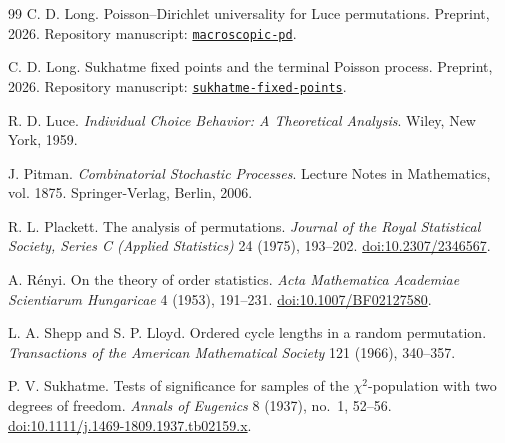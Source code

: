 \documentclass[11pt]{article}
\theoremstyle{definition}
\theoremstyle{remark}
\begin{document}
\begin{thebibliography}{99}
C. D. Long.
\newblock Poisson--Dirichlet universality for Luce permutations.
\newblock Preprint, 2026.
\newblock Repository manuscript:
\href{https://github.com/long-mathematics/luce-tsetlin-permutations/blob/25b7e4490c32418b818b2356106228283986dd6c/papers/macroscopic-pd/poisson-dirichlet-luce.tex}{\texttt{macroscopic-pd}}.

C. D. Long.
\newblock Sukhatme fixed points and the terminal Poisson process.
\newblock Preprint, 2026.
\newblock Repository manuscript:
\href{https://github.com/long-mathematics/luce-tsetlin-permutations/tree/main/papers/sukhatme-fixed-points}{\texttt{sukhatme-fixed-points}}.

R. D. Luce.
\newblock \emph{Individual Choice Behavior: A Theoretical Analysis}.
\newblock Wiley, New York, 1959.

J. Pitman.
\newblock \emph{Combinatorial Stochastic Processes}.
\newblock Lecture Notes in Mathematics, vol. 1875.
\newblock Springer-Verlag, Berlin, 2006.

R. L. Plackett.
\newblock The analysis of permutations.
\newblock \emph{Journal of the Royal Statistical Society, Series C
(Applied Statistics)} 24 (1975), 193--202.
\newblock \href{https://doi.org/10.2307/2346567}
{doi:10.2307/2346567}.

A. R\'enyi.
\newblock On the theory of order statistics.
\newblock \emph{Acta Mathematica Academiae Scientiarum Hungaricae}
4 (1953), 191--231.
\newblock \href{https://doi.org/10.1007/BF02127580}
{doi:10.1007/BF02127580}.

L. A. Shepp and S. P. Lloyd.
\newblock Ordered cycle lengths in a random permutation.
\newblock \emph{Transactions of the American Mathematical Society}
121 (1966), 340--357.

P. V. Sukhatme.
\newblock Tests of significance for samples of the $\chi^2$-population with
two degrees of freedom.
\newblock \emph{Annals of Eugenics} 8 (1937), no.~1, 52--56.
\newblock \href{https://doi.org/10.1111/j.1469-1809.1937.tb02159.x}
{doi:10.1111/j.1469-1809.1937.tb02159.x}.

\end{thebibliography}
\end{document}
